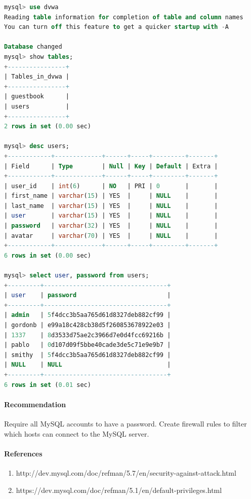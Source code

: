 \documentclass{article}
\begin{document}
\begin{lstlisting}[language=SQL,basicstyle=\tiny]
mysql> use dvwa
Reading table information for completion of table and column names
You can turn off this feature to get a quicker startup with -A

Database changed
mysql> show tables;
+----------------+
| Tables_in_dvwa |
+----------------+
| guestbook      |
| users          |
+----------------+
2 rows in set (0.00 sec)

mysql> desc users;
+------------+-------------+------+-----+---------+-------+
| Field      | Type        | Null | Key | Default | Extra |
+------------+-------------+------+-----+---------+-------+
| user_id    | int(6)      | NO   | PRI | 0       |       |
| first_name | varchar(15) | YES  |     | NULL    |       |
| last_name  | varchar(15) | YES  |     | NULL    |       |
| user       | varchar(15) | YES  |     | NULL    |       |
| password   | varchar(32) | YES  |     | NULL    |       |
| avatar     | varchar(70) | YES  |     | NULL    |       |
+------------+-------------+------+-----+---------+-------+
6 rows in set (0.00 sec)

mysql> select user, password from users;
+---------+----------------------------------+
| user    | password                         |
+---------+----------------------------------+
| admin   | 5f4dcc3b5aa765d61d8327deb882cf99 |
| gordonb | e99a18c428cb38d5f260853678922e03 |
| 1337    | 8d3533d75ae2c3966d7e0d4fcc69216b |
| pablo   | 0d107d09f5bbe40cade3de5c71e9e9b7 |
| smithy  | 5f4dcc3b5aa765d61d8327deb882cf99 |
| NULL    | NULL                             |
+---------+----------------------------------+
6 rows in set (0.01 sec)
\end{lstlisting}

\paragraph{Recommendation}

Require all MySQL accounts to have a password.
Create firewall rules to filter which hosts can connect to the MySQL server.

\paragraph{References}

\begin{enumerate}
  \item http://dev.mysql.com/doc/refman/5.7/en/security-against-attack.html
  \item https://dev.mysql.com/doc/refman/5.1/en/default-privileges.html
\end{enumerate}
\end{document}
